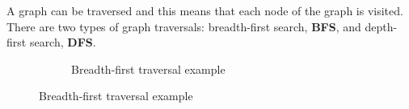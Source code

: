 A graph can be traversed and this means that each node of the graph is visited.
There are two types of graph traversals: breadth-first search, \textbf{BFS}, and depth-first search, \textbf{DFS}.
\begin{figure}
	\begin{subfigure}[b]{0.3\textwidth}
		\begin{center}
		\end{center}
		\caption{Breadth-first traversal example}
		\label{fig:bfs}
	\end{subfigure}


\end{figure}
